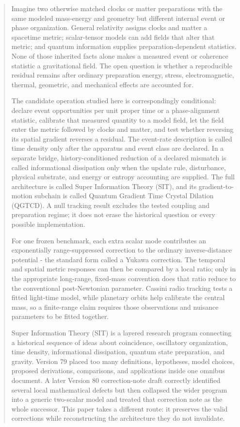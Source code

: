 \documentclass[
  american,
  11pt,
  letterpaper,
]{article}
\begin{document}
\begin{abstract}

Imagine two otherwise matched clocks or matter preparations with the same modeled mass-energy and geometry but different internal event or phase organization. General relativity assigns clocks and matter a spacetime metric; scalar-tensor models can add fields that alter that metric; and quantum information supplies preparation-dependent statistics. None of those inherited facts alone makes a measured event or coherence statistic a gravitational field. The open question is whether a reproducible residual remains after ordinary preparation energy, stress, electromagnetic, thermal, geometric, and mechanical effects are accounted for.

The candidate operation studied here is correspondingly conditional: declare event opportunities per unit proper time or a phase-alignment statistic, calibrate that measured quantity to a model field, let the field enter the metric followed by clocks and matter, and test whether reversing its spatial gradient reverses a residual. The event-rate description is called time density only after the apparatus and event class are declared. In a separate bridge, history-conditioned reduction of a declared mismatch is called informational dissipation only when the update rule, disturbance, physical substrate, and energy or entropy accounting are supplied. The full architecture is called Super Information Theory (SIT), and its gradient-to-motion subchain is called Quantum Gradient Time Crystal Dilation (QGTCD). A null tracking result excludes the tested coupling and preparation regime; it does not erase the historical question or every possible implementation.

For one frozen benchmark, each extra scalar mode contributes an exponentially range-suppressed correction to the ordinary inverse-distance potential - the standard form called a Yukawa correction. The temporal and spatial metric responses can then be compared by a local ratio; only in the appropriate long-range, fixed-mass convention does that ratio reduce to the conventional post-Newtonian parameter. Cassini radio tracking tests a fitted light-time model, while planetary orbits help calibrate the central mass, so a finite-range claim requires those observations and nuisance parameters to be fitted together.

Super Information Theory (SIT) is a layered research program connecting a historical sequence of ideas about coincidence, oscillatory organization, time density, informational dissipation, quantum state preparation, and gravity. Version 79 placed too many definitions, hypotheses, model choices, proposed derivations, comparisons, and applications inside one omnibus document. A later Version 80 correction-note draft correctly identified several local mathematical defects but then collapsed the wider program into a generic two-scalar model and treated that correction note as the whole successor. This paper takes a different route: it preserves the valid corrections while reconstructing the architecture they do not invalidate.


\end{abstract}
\end{document}
